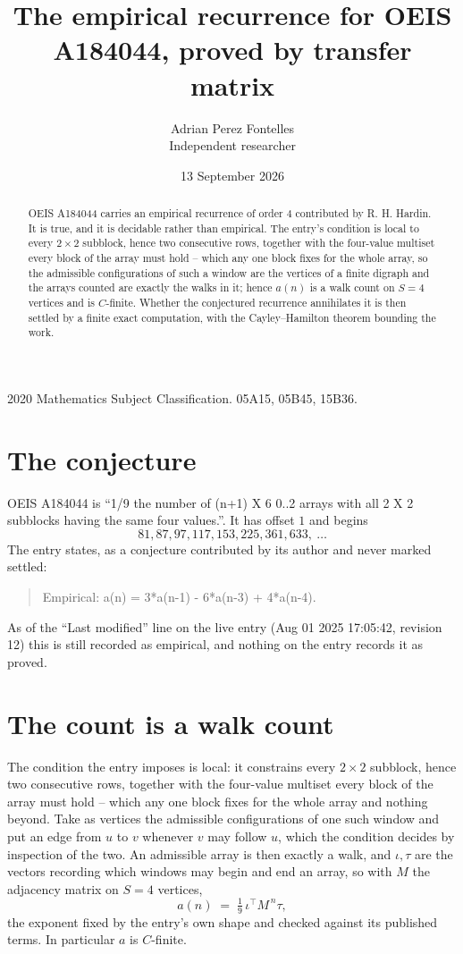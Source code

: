 \documentclass[11pt,a4paper]{article}
\title{The empirical recurrence for OEIS A184044, proved by transfer matrix}
\author{Adrian Perez Fontelles\\ \small Independent researcher}
\date{13 September 2026}
\theoremstyle{plain}
\theoremstyle{definition}
\begin{document}
\maketitle

\begin{abstract}
OEIS A184044 carries an empirical recurrence of order $4$ contributed by R. H. Hardin. It is
true, and it is decidable rather than empirical. The entry's condition is local to every $2\times2$ subblock, hence two consecutive rows, together with the four-value multiset every block of the array must hold -- which any one block fixes for the whole array, so
the admissible configurations of such a window are the vertices of a finite digraph and the
arrays counted are exactly the walks in it; hence $a(n)$ is a walk count on $S=4$ vertices
and is $C$-finite. Whether the conjectured recurrence annihilates it is then settled by a
finite exact computation, with the Cayley--Hamilton theorem bounding the work.
\end{abstract}

\noindent\small 2020 Mathematics Subject Classification. 05A15, 05B45, 15B36.\normalsize

\section{The conjecture}

OEIS A184044 is ``1/9 the number of (n+1) X 6 0..2 arrays with all 2 X 2 subblocks having the same four values.''. It has offset $1$ and begins
\[
81, 87, 97, 117, 153, 225, 361, 633,\ \dots
\]
The entry states, as a conjecture contributed by its author and never marked settled:
\begin{quote}
Empirical: a(n) = 3*a(n-1) - 6*a(n-3) + 4*a(n-4).
\end{quote}
As of the ``Last modified'' line on the live entry (Aug 01 2025 17:05:42, revision 12) this is still
recorded as empirical, and nothing on the entry records it as proved.

\section{The count is a walk count}

The condition the entry imposes is local: it constrains every $2\times2$ subblock, hence two consecutive rows, together with the four-value multiset every block of the array must hold -- which any one block fixes for the whole array and nothing beyond. Take as vertices the admissible configurations of one such window and put an edge from $u$ to $v$ whenever $v$ may follow $u$, which the condition decides by inspection of the two.
An admissible array is then exactly a walk, and $\iota,\tau$ are the vectors recording which windows may begin and end an array, so with $M$ the adjacency matrix on $S=4$ vertices,
\[
a(n)\;=\;\tfrac{1}{9}\,\iota^{\!\top}M^{\,n}\tau ,
\]
the exponent fixed by the entry's own shape and checked against its published terms. In
particular $a$ is $C$-finite.
\end{document}
